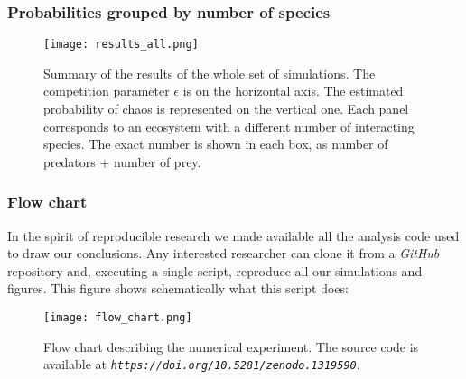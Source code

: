 \subsubsection{Probabilities grouped by number of species}
\label{subsubsec:AllProbabilities}
\begin{figure}[H]
	\begin{center}
		\texttt{[image: results\_all.png]}
	\end{center}
	\caption{Summary of the results of the whole set of simulations. The competition parameter $\epsilon$ is on the horizontal axis. The estimated probability of chaos is represented on the vertical one. Each panel corresponds to an ecosystem with a different number of interacting species. The exact number is shown in each box, as number of predators + number of prey.}
	\label{fig:AllProbabilities}
\end{figure}

\subsubsection{Flow chart}
\label{subsubsec:FlowChart}
In the spirit of reproducible research we made available all the analysis code used to draw our conclusions. Any interested researcher can clone it from a \textit{GitHub} repository \cite{Rodriguez-Sanchez-code-neuchaos} and, executing a single script, reproduce all our simulations and figures. This figure shows schematically what this script does:

\begin{figure}[H]
	\begin{center}
		\texttt{[image: flow\_chart.png]}
	\end{center}
	\caption{Flow chart describing the numerical experiment. The source code is available at \textit{\texttt{https://doi.org/10.5281/zenodo.1319590}}.}
	\label{fig:FlowChart}
\end{figure}
